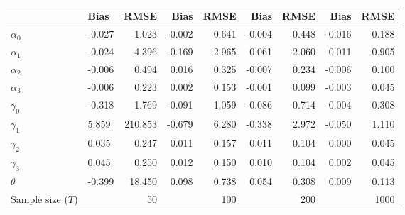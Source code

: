 
\begin{tabular}[t]{llrrrrrrr}
\toprule
  & Bias & RMSE & Bias & RMSE & Bias & RMSE & Bias & RMSE\\
\midrule
$\alpha_{0}$ & -0.027 & 1.023 & -0.002 & 0.641 & -0.004 & 0.448 & -0.016 & 0.188\\
$\alpha_{1}$ & -0.024 & 4.396 & -0.169 & 2.965 & 0.061 & 2.060 & 0.011 & 0.905\\
$\alpha_{2}$ & -0.006 & 0.494 & 0.016 & 0.325 & -0.007 & 0.234 & -0.006 & 0.100\\
$\alpha_{3}$ & -0.006 & 0.223 & 0.002 & 0.153 & -0.001 & 0.099 & -0.003 & 0.045\\
$\gamma_{0}$ & -0.318 & 1.769 & -0.091 & 1.059 & -0.086 & 0.714 & -0.004 & 0.308\\
$\gamma_{1}$ & 5.859 & 210.853 & -0.679 & 6.280 & -0.338 & 2.972 & -0.050 & 1.110\\
$\gamma_{2}$ & 0.035 & 0.247 & 0.011 & 0.157 & 0.011 & 0.104 & 0.000 & 0.045\\
$\gamma_{3}$ & 0.045 & 0.250 & 0.012 & 0.150 & 0.010 & 0.104 & 0.002 & 0.045\\
$\theta$ & -0.399 & 18.450 & 0.098 & 0.738 & 0.054 & 0.308 & 0.009 & 0.113\\
Sample size ($T$) &  & 50 &  & 100 &  & 200 &  & 1000\\
\bottomrule
\end{tabular}
